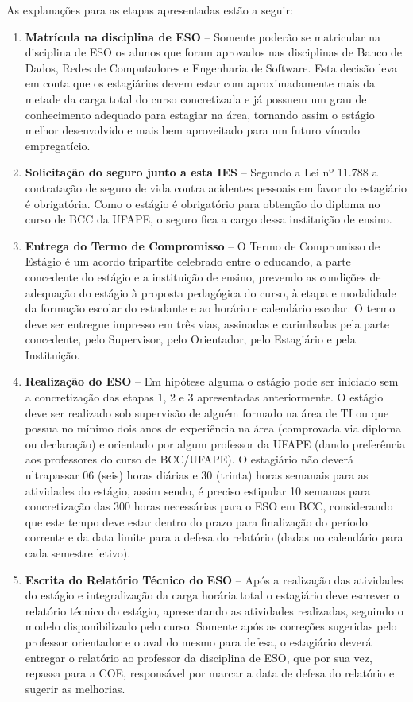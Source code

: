 \documentclass[
	12pt,				%
	openright,			%
  oneside,     %
	a4paper,			%
	english,			%
	french,				%
	spanish,			%
	brazil				%
	]{abntex2}
\begin{document}
As explanações para as etapas apresentadas estão a seguir:

\begin{enumerate}
    \item \textbf{Matrícula na disciplina de ESO} – Somente poderão se matricular na disciplina de ESO os alunos que foram aprovados nas disciplinas de Banco de Dados, Redes de Computadores e Engenharia de Software. Esta decisão leva em conta que os estagiários devem estar com aproximadamente mais da metade da carga total do curso concretizada e já possuem um grau de conhecimento adequado para estagiar na área, tornando assim o estágio melhor desenvolvido e mais bem aproveitado para um futuro vínculo empregatício.
    \item \textbf{Solicitação do seguro junto a esta IES} – Segundo a Lei nº 11.788 a contratação de seguro de vida contra acidentes pessoais em favor do estagiário é obrigatória. Como o estágio é obrigatório para obtenção do diploma no curso de BCC da UFAPE, o seguro fica a cargo dessa instituição de ensino.
    \item \textbf{Entrega do Termo de Compromisso} – O Termo de Compromisso de Estágio é um acordo tripartite celebrado entre o educando, a parte concedente do estágio e a instituição de ensino, prevendo as condições de adequação do estágio à proposta pedagógica do  curso, à etapa e modalidade da formação escolar  do  estudante  e ao horário e calendário escolar. O termo deve ser entregue impresso em três vias, assinadas e carimbadas pela parte concedente, pelo  Supervisor,  pelo  Orientador, pelo Estagiário e pela Instituição.
    \item \textbf{Realização do ESO} – Em hipótese alguma o estágio pode ser iniciado sem a concretização das etapas 1, 2 e 3 apresentadas anteriormente. O estágio deve ser realizado sob supervisão de alguém formado na área de TI ou que possua no mínimo dois anos de experiência na área (comprovada via diploma ou declaração) e orientado por algum professor da UFAPE (dando preferência aos professores do curso de BCC/UFAPE). O estagiário não deverá ultrapassar 06 (seis) horas diárias e 30 (trinta) horas semanais para as atividades do estágio, assim sendo, é preciso estipular 10 semanas para concretização das 300 horas necessárias para o ESO em BCC, considerando que este tempo deve estar dentro do prazo para finalização do período corrente e da data limite para a defesa do relatório (dadas no calendário para cada semestre letivo).
    \item \textbf{Escrita do Relatório Técnico do ESO} – Após a realização das atividades do estágio e integralização da carga horária total o estagiário deve escrever o relatório técnico do estágio, apresentando as atividades realizadas, seguindo o modelo disponibilizado pelo curso. Somente após as correções sugeridas pelo professor orientador e o aval do mesmo para defesa, o estagiário deverá entregar o relatório ao professor da disciplina de ESO, que por sua vez, repassa para a COE, responsável por marcar a data de defesa do relatório e sugerir as melhorias.

\end{enumerate}
\end{document}
